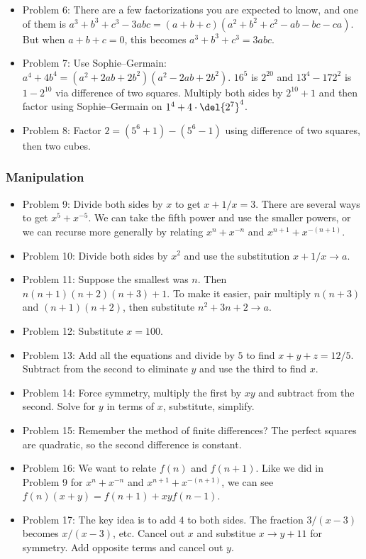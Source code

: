 \documentclass[10pt,paper=letter]{scrartcl}
\begin{document}
\begin{itemize}
  \item Problem 6: There are a few factorizations you are expected to know, and one of them is $a^3 + b^3 + c^3 - 3abc = (a + b + c)(a^2 + b^2 + c^2 - ab - bc - ca)$. But when $a + b + c = 0$, this becomes $a^3 + b^3 + c^3 = 3abc$.
  \item Problem 7: Use Sophie--Germain: $a^4 + 4b^4 = (a^2 + 2ab + 2b^2)(a^2 - 2ab + 2b^2)$. $16^5$ is $2^{20}$ and $13^4 - 172^2$ is $1 - 2^{10}$ via difference of two squares. Multiply both sides by $2^{10} + 1$ and then factor using Sophie--Germain on $1^4 + 4 \cdot \del{2^7}^4$.
  \item Problem 8: Factor $2 = (5^6 + 1) - (5^6 - 1)$ using difference of two squares, then two cubes.
\end{itemize}

\subsubsection*{Manipulation}

\begin{itemize}
  \item Problem 9: Divide both sides by $x$ to get $x + 1/x = 3$. There are several ways to get $x^5 + x^{-5}$. We can take the fifth power and use the smaller powers, or we can recurse more generally by relating $x^n + x^{-n}$ and $x^{n+1} + x^{-(n+1)}$.
  \item Problem 10: Divide both sides by $x^2$ and use the substitution $x + 1/x \rightarrow a$. 
  \item Problem 11: Suppose the smallest was $n$. Then $n(n+1)(n+2)(n+3) + 1$. To make it easier, pair multiply $n(n+3)$ and $(n+1)(n+2)$, then substitute $n^2 + 3n + 2 \rightarrow a$.
  \item Problem 12: Substitute $x = 100$.
  \item Problem 13: Add all the equations and divide by $5$ to find $x + y + z = 12/5$. Subtract from the second to eliminate $y$ and use the third to find $x$.
  \item Problem 14: Force symmetry, multiply the first by $xy$ and subtract from the second. Solve for $y$ in terms of $x$, substitute, simplify.
  \item Problem 15: Remember the method of finite differences? The perfect squares are quadratic, so the second difference is constant. 
  \item Problem 16: We want to relate $f(n)$ and $f(n+1)$. Like we did in Problem 9 for $x^n + x^{-n}$ and $x^{n+1} + x^{-(n+1)}$, we can see $f(n)(x + y) = f(n+1) + xyf(n-1)$.
  \item Problem 17: The key idea is to add $4$ to both sides. The fraction $3/(x-3)$ becomes $x/(x-3)$, etc. Cancel out $x$ and substitue $x \to y+11$ for symmetry. Add opposite terms and cancel out $y$.
\end{itemize}
\end{document}
